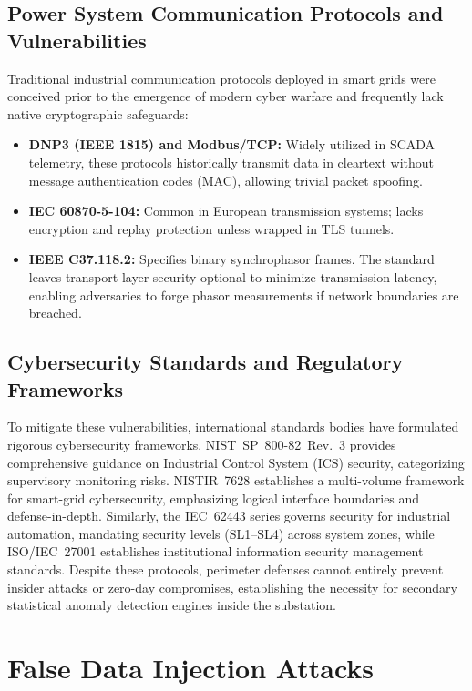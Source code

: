 \documentclass[12pt,a4paper]{report}
\begin{document}
\subsection{Power System Communication Protocols and Vulnerabilities}
Traditional industrial communication protocols deployed in smart grids were conceived
prior to the emergence of modern cyber warfare and frequently lack native cryptographic
safeguards:
\begin{itemize}
    \item \textbf{DNP3 (IEEE 1815) and Modbus/TCP:} Widely utilized in SCADA telemetry,
    these protocols historically transmit data in cleartext without message authentication
    codes (MAC), allowing trivial packet spoofing.
    \item \textbf{IEC 60870-5-104:} Common in European transmission systems; lacks
    encryption and replay protection unless wrapped in TLS tunnels.
    \item \textbf{IEEE C37.118.2:} Specifies binary synchrophasor frames. The standard
    leaves transport-layer security optional to minimize transmission latency, enabling
    adversaries to forge phasor measurements if network boundaries are breached.
\end{itemize}

\subsection{Cybersecurity Standards and Regulatory Frameworks}
To mitigate these vulnerabilities, international standards bodies have formulated
rigorous cybersecurity frameworks. NIST~SP~800-82~Rev.~3 \cite{nist80082} provides
comprehensive guidance on Industrial Control System (ICS) security, categorizing supervisory
monitoring risks. NISTIR~7628 \cite{nist7628,nist7628r1} establishes a multi-volume
framework for smart-grid cybersecurity, emphasizing logical interface boundaries and
defense-in-depth. Similarly, the IEC~62443 series governs security for industrial
automation, mandating security levels (SL1--SL4) across system zones, while ISO/IEC~27001
\cite{iso27001} establishes institutional information security management standards.
Despite these protocols, perimeter defenses cannot entirely prevent insider attacks or
zero-day compromises, establishing the necessity for secondary statistical anomaly
detection engines inside the substation.

\section{False Data Injection Attacks}
\end{document}
